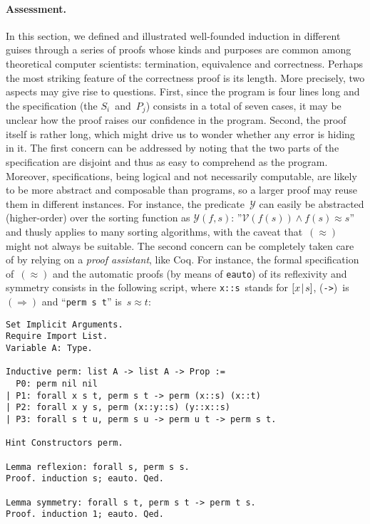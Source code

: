 \medskip

\paragraph{Assessment.} In this section, we defined and illustrated
well\hyp{}founded induction in different guises through a series of
proofs whose kinds and purposes are common among theoretical computer
scientists: termination, equivalence and correctness. Perhaps the most
striking feature of the correctness proof is its length. More
precisely, two aspects may give rise to questions. First, since the
program is four lines long and the specification (the
\(S_i\)~and~\(P_j\)) consists in a total of seven cases, it may be
unclear how the proof raises our confidence in the program. Second,
the proof itself is rather long, which might drive us to wonder
whether any error is hiding in it. The first concern can be addressed
by noting that the two parts of the specification are disjoint and
thus as easy to comprehend as the program. Moreover, specifications,
being logical and not necessarily computable, are likely to be more
abstract and composable than programs, so a larger proof may reuse
them in different instances. For instance, the
predicate~\(\mathcal{Y}\) can easily be abstracted (higher\hyp{}order)
over the sorting function as \(\mathcal{Y}(f,s)\):
''\(\mathcal{V}(f(s)) \mathrel{\wedge} f(s) \approx s\)'' and thusly
applies to many sorting algorithms, with the caveat that~\((\approx)\)
might not always be suitable. The second concern can be completely
taken care of by relying on a \emph{proof assistant}, like
\textsf{Coq}. For instance, the formal specification of~\((\approx)\)
and the automatic proofs (by means of \texttt{eauto}) of its
reflexivity and symmetry consists in the following script, where
\verb|x::s|~stands for \([{x}\!\mid\!{s}]\), (\verb|->|)~is
\((\Rightarrow)\) and ``\verb|perm s t|'' is~\({s \approx t}\):
\begin{verbatim}
Set Implicit Arguments.
Require Import List.
Variable A: Type.

Inductive perm: list A -> list A -> Prop :=
  P0: perm nil nil
| P1: forall x s t, perm s t -> perm (x::s) (x::t)
| P2: forall x y s, perm (x::y::s) (y::x::s)
| P3: forall s t u, perm s u -> perm u t -> perm s t.

Hint Constructors perm.

Lemma reflexion: forall s, perm s s.
Proof. induction s; eauto. Qed.

Lemma symmetry: forall s t, perm s t -> perm t s.
Proof. induction 1; eauto. Qed.
\end{verbatim}
